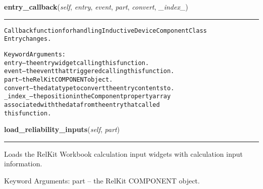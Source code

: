     \vspace{0.5ex}

\hspace{.8\funcindent}\begin{boxedminipage}{\funcwidth}

    \raggedright \textbf{entry\_callback}(\textit{self}, \textit{entry}, \textit{event}, \textit{part}, \textit{convert}, \textit{\_index\_})

    \vspace{-1.5ex}

    \rule{\textwidth}{0.5\fboxrule}
\setlength{\parskip}{2ex}
\begin{alltt}
Callback function for handling Inductive Device Component Class
Entry changes.

Keyword Arguments:
  entry -- the entry widget calling this function.
  event -- the event that triggered calling this function.
   part -- the RelKit COMPONENT object.
convert -- the data type to convert the entry contents to.
\_index\_ -- the position in the Component property array
           associated with the data from the entry that called
           this function.
\end{alltt}

\setlength{\parskip}{1ex}
    \end{boxedminipage}

    \label{reliafree:inductors:inductor:Inductor:load_reliability_inputs}

    \vspace{0.5ex}

\hspace{.8\funcindent}\begin{boxedminipage}{\funcwidth}

    \raggedright \textbf{load\_reliability\_inputs}(\textit{self}, \textit{part})

    \vspace{-1.5ex}

    \rule{\textwidth}{0.5\fboxrule}
\setlength{\parskip}{2ex}
    Loads the RelKit Workbook calculation input widgets with calculation
    input information.

    Keyword Arguments: part -- the RelKit COMPONENT object.

\setlength{\parskip}{1ex}
    \end{boxedminipage}

